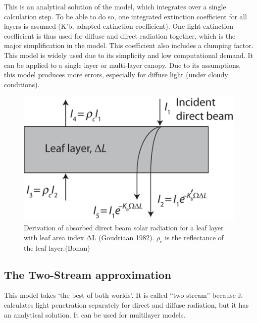 \documentclass[12pt,oneside]{book}
\begin{document}
This is an analytical solution of the model, which integrates over a
single calculation step. To be able to do so, one integrated extinction
coefficient for all layers is assumed (K'b, adapted extinction
coefficient). One light extinction coefficient is thus used for diffuse
and direct radiation together, which is the major simplification in the
model. This coefficient also includes a clumping factor. This model is
widely used due to its simplicity and low computational demand. It can
be applied to a single layer or multi-layer canopy. Due to its
assumptions, this model produces more errors, especially for diffuse
light (under cloudy conditions).

\begin{figure}

{\centering \includegraphics[width=0.8\linewidth]{figures/chap3/f320_goudriaan} 

}

\caption{ Derivation of absorbed direct beam solar radiation for a leaf layer with leaf area index ΔL (Goudriaan 1982). $ρ_c$ is the reflectance of the leaf layer.(Bonan)}\label{fig:f320}
\end{figure}

\subsection{The Two-Stream
approximation}\label{the-two-stream-approximation}

This model takes `the best of both worlds'. It is called ``two stream''
because it calculates light penetration separately for direct and
diffuse radiation, but it has an analytical solution. It can be used for
multilayer models.
\end{document}

